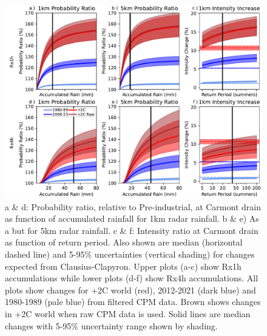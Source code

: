 \documentclass[11pt,a4paper]{article}
\begin{document}
    


\begin{figure}
	\centering
	\includegraphics[width=1\linewidth]{intens_prob_ratios}
	\caption{a \& d: Probability ratio, relative to Pre-industrial, at Carmont drain as function of accumulated rainfall for 1km radar rainfall. b \& e) As a but for 5km radar rainfall. c \& f: Intensity ratio at Carmont drain  as function of  return period. Also shown are median (horizontal dashed line) and 5-95\% uncertainties (vertical shading) for changes expected from Clausius-Clapyron. Upper plots (a-c) show Rx1h accumulations while lower plots (d-f) show Rx4h accumulations. All plots show changes for +2C world (red), 2012-2021 (dark blue) and 1980-1989 (pale blue) from filtered CPM data. Brown shows changes in +2C world when raw CPM data is used.   Solid lines are median changes with 5-95\% uncertainty range shown by  shading.}
	\label{fig:int_pr}
\end{figure}
\end{document}
